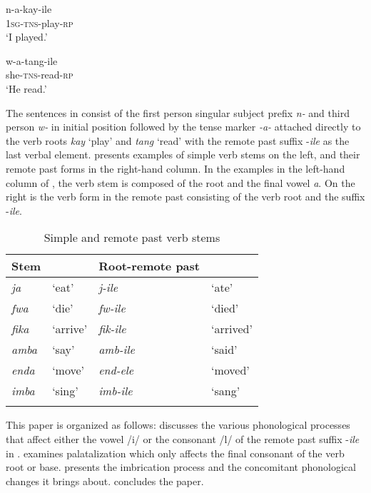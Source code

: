 \documentclass[output=paper]{langsci/langscibook}
\begin{document}
\ea
\label{ex:1.kawasha}
	\ea\label{ex:1a.kawasha}
\gll n-a-kay-ile \\
	\textsc{1sg-tns}-play-\textsc{rp} \\
\glt `I played.'

	\ex\label{ex:1b.kawasha}
\gll w-a-tang-ile \\
	she-\textsc{tns}-read-\textsc{rp} \\
\glt `He read.'
	\z
\z 



The sentences in  consist of the first person singular subject prefix \textit{n-} and third person \textit{w-} in initial position followed by the tense marker \textit{-a-} attached directly to the verb roots \textit{kay} ‘play’ and \textit{tang} ‘read’ with the remote past suffix -\textit{ile} as the last verbal element.  presents examples of simple verb stems on the left, and their remote past forms in the right-hand column. In the examples in the left-hand column of , the verb stem is composed of the root and the final vowel \textit{a}. On the right is the verb form in the remote past consisting of the verb root and the suffix -\textit{ile}.


\begin{table}
\begin{tabularx}{\textwidth}{XXXX}
\lsptoprule
  Stem &  &   Root-remote past & \\
\midrule
\textit{ja } & `eat' & \textit{j-ile} & `ate' \\
\textit{fwa} & `die' & \textit{fw-ile} & `died' \\
\textit{fika} & `arrive' & \textit{fik-ile} & `arrived' \\
\textit{amba} & `say' & \textit{amb-ile} & `said' \\
\textit{enda} & `move' & \textit{end-ele} & `moved' \\
\textit{imba} & `sing' & \textit{imb-ile} & `sang' \\

\lspbottomrule
\end{tabularx}

\caption{Simple and remote past verb stems}
\label{tab:1.kawasha}

 \end{table}


This paper is organized as follows:  discusses the various phonological processes that affect either the vowel /i/ or the consonant /l/ of the remote past suffix -\textit{ile} in .  examines palatalization which only affects the final consonant of the verb root or base.  presents the imbrication process and the concomitant phonological changes it brings about.  concludes the paper.
\end{document}
